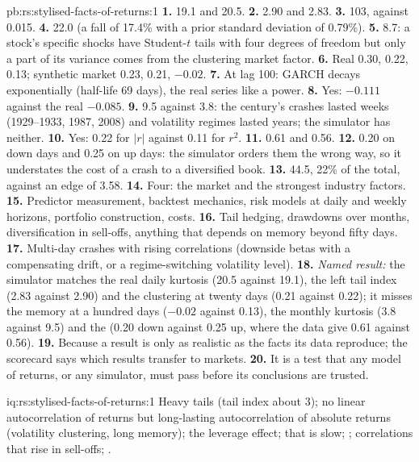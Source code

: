 \begin{solution}{pb:rs:stylised-facts-of-returns:1}
\textbf{1.} 19.1 and 20.5. \textbf{2.} 2.90 and 2.83. \textbf{3.} 103, against 0.015. \textbf{4.} 22.0 (a fall of 17.4\% with a
prior standard deviation of 0.79\%). \textbf{5.} 8.7: a stock's specific shocks have Student-$t$ tails with four degrees of freedom
but only a part of its variance comes from the clustering market factor. \textbf{6.} Real 0.30, 0.22, 0.13; synthetic market 0.23,
0.21, $-0.02$. \textbf{7.} At lag 100: GARCH decays exponentially (half-life 69 days), the real series like a power. \textbf{8.} Yes:
$-0.111$ against the real $-0.085$. \textbf{9.} 9.5 against 3.8: the century's crashes lasted weeks (1929--1933, 1987, 2008) and
volatility regimes lasted years; the simulator has neither. \textbf{10.} Yes: 0.22 for $|r|$ against 0.11 for $r^2$.
\textbf{11.} 0.61 and 0.56. \textbf{12.} 0.20 on down days and 0.25 on up days: the simulator orders them the wrong way, so it
understates the cost of a crash to a diversified book. \textbf{13.} 44.5, 22\% of the total, against an edge of 3.58.
\textbf{14.} Four: the market and the strongest industry factors. \textbf{15.} Predictor measurement, backtest mechanics, risk models
at daily and weekly horizons, portfolio construction, costs. \textbf{16.} Tail hedging, drawdowns over months, diversification in
sell-offs, anything that depends on memory beyond fifty days. \textbf{17.} Multi-day crashes with rising correlations (downside
betas with a compensating drift, or a regime-switching volatility level). \textbf{18.} \emph{Named result:} the simulator matches the
real daily kurtosis (20.5 against 19.1), the left tail index (2.83 against 2.90) and the clustering at twenty days (0.21 against 0.22);
it misses the memory at a hundred days ($-0.02$ against 0.13), the monthly kurtosis (3.8 against 9.5) and the 
(0.20 down against 0.25 up, where the data give 0.61 against 0.56). \textbf{19.} Because a result is only as realistic as the facts
its data reproduce; the scorecard says which results transfer to markets. \textbf{20.} It is a test that any model of returns, or any
simulator, must pass before its conclusions are trusted.
\end{solution}

\begin{solution}{iq:rs:stylised-facts-of-returns:1}
Heavy tails (tail index about 3); no linear autocorrelation of returns but long-lasting autocorrelation of absolute returns
(volatility clustering, long memory); the leverage effect;  that is slow; ; correlations
that rise in sell-offs; .
\end{solution}

